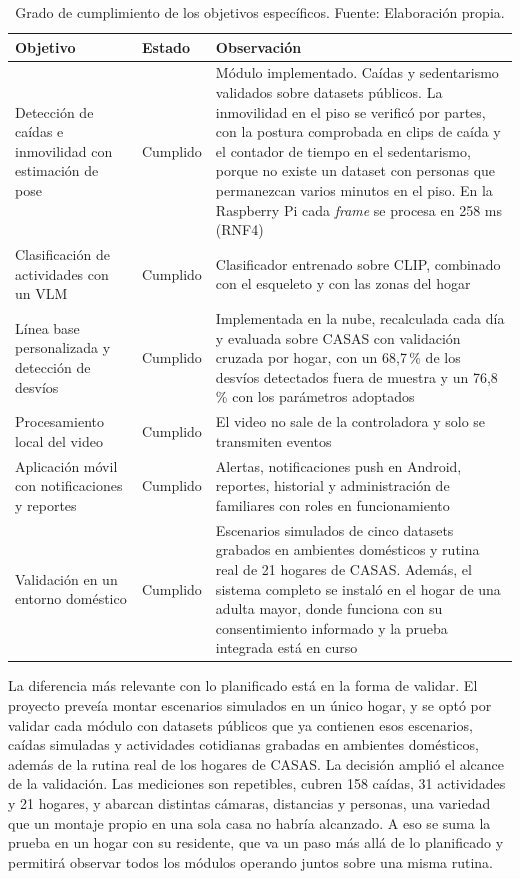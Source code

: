 \begin{table}[H]
\centering
\caption[Grado de cumplimiento de los objetivos específicos.]{Grado de cumplimiento de los objetivos específicos. Fuente: Elaboración propia.}
\label{tab:objetivos_logrados}
\small
\begin{tabular}{@{}p{4.4cm}p{2.2cm}p{7.8cm}@{}}
\toprule
\textbf{Objetivo} & \textbf{Estado} & \textbf{Observación} \\
\midrule
Detección de caídas e inmovilidad con estimación de pose & Cumplido & Módulo implementado. Caídas y sedentarismo validados sobre datasets públicos. La inmovilidad en el piso se verificó por partes, con la postura comprobada en clips de caída y el contador de tiempo en el sedentarismo, porque no existe un dataset con personas que permanezcan varios minutos en el piso. En la Raspberry Pi cada \textit{frame} se procesa en 258 ms (RNF4) \\
Clasificación de actividades con un VLM & Cumplido & Clasificador entrenado sobre CLIP, combinado con el esqueleto y con las zonas del hogar \\
Línea base personalizada y detección de desvíos & Cumplido & Implementada en la nube, recalculada cada día y evaluada sobre CASAS con validación cruzada por hogar, con un 68,7\,\% de los desvíos detectados fuera de muestra y un 76,8\,\% con los parámetros adoptados \\
Procesamiento local del video & Cumplido & El video no sale de la controladora y solo se transmiten eventos \\
Aplicación móvil con notificaciones y reportes & Cumplido & Alertas, notificaciones push en Android, reportes, historial y administración de familiares con roles en funcionamiento \\
Validación en un entorno doméstico & Cumplido & Escenarios simulados de cinco datasets grabados en ambientes domésticos y rutina real de 21 hogares de CASAS. Además, el sistema completo se instaló en el hogar de una adulta mayor, donde funciona con su consentimiento informado y la prueba integrada está en curso \\
\bottomrule
\end{tabular}
\end{table}

La diferencia más relevante con lo planificado está en la forma de validar.
El proyecto preveía montar escenarios simulados en un único hogar, y se optó por validar cada módulo con datasets públicos que ya contienen esos escenarios, caídas simuladas y actividades cotidianas grabadas en ambientes domésticos, además de la rutina real de los hogares de CASAS.
La decisión amplió el alcance de la validación.
Las mediciones son repetibles, cubren 158 caídas, 31 actividades y 21 hogares, y abarcan distintas cámaras, distancias y personas, una variedad que un montaje propio en una sola casa no habría alcanzado.
A eso se suma la prueba en un hogar con su residente, que va un paso más allá de lo planificado y permitirá observar todos los módulos operando juntos sobre una misma rutina.


